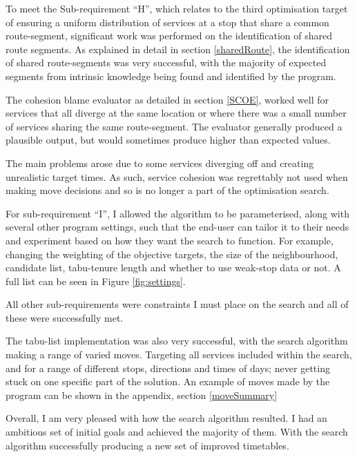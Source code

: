 \documentclass{article}
\begin{document}
\par 
To meet the Sub-requirement ``H'', which relates to the third optimisation target of ensuring a uniform distribution of services at a stop that share a common route-segment, significant work was performed on the identification of shared route segments. As explained in detail in section \ref{sharedRoute}, the identification of shared route-segments was very successful, with the majority of expected segments from intrinsic knowledge being found and identified by the program.



\par
The cohesion blame evaluator as detailed in section \ref{SCOE}, worked well for services that all diverge at the same location or where there was a small number of services sharing the same route-segment. The evaluator generally produced a plausible output, but would sometimes produce higher than expected values.

\par 
The main problems arose due to some services diverging off and creating unrealistic target times. As such, service cohesion was regrettably not used when making move decisions and so is no longer a part of the optimisation search.  

\par 
For sub-requirement ``I'', I allowed the algorithm to be parameterised, along with several other program settings, such that the end-user can tailor it to their needs and experiment based on how they want the search to function. For example, changing the weighting of the objective targets, the size of the neighbourhood, candidate list, tabu-tenure length and whether to use weak-stop data or not. A full list can be seen in Figure \ref{fig:settings}.

\par
All other sub-requirements were constraints I must place on the search and all of these were successfully met. 

\par
The tabu-list implementation was also very successful, with the search algorithm making a range of varied moves. Targeting all services included within the search, and for a range of different stops, directions and times of days; never getting stuck on one specific part of the solution. An example of moves made by the program can be shown in the appendix, section \ref{moveSummary}

\par 
Overall, I am very pleased with how the search algorithm resulted. I had an ambitious set of initial goals and achieved the majority of them. With the search algorithm successfully producing a new set of improved timetables. 
\end{document}
